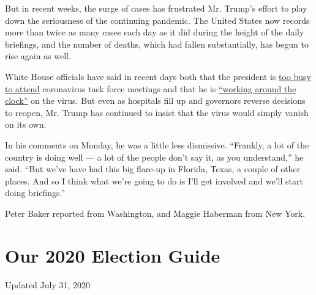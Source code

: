 But in recent weeks, the surge of cases has frustrated Mr. Trump's
effort to play down the seriousness of the continuing pandemic. The
United States now records more than twice as many cases each day as it
did during the height of the daily briefings, and the number of deaths,
which had fallen substantially, has begun to rise again as well.

White House officials have said in recent days both that the president
is
\href{https://www.washingtonpost.com/politics/trump-defends-bungled-handling-of-coronavirus-with-falsehoods-and-dubious-claims/2020/07/19/1b57cb3e-c9e6-11ea-91f1-28aca4d833a0_story.html}{too
busy to attend} coronavirus task force meetings and that he is
\href{https://www.nytimes.com/2020/07/19/us/politics/republicans-contradict-trump-coronavirus.html}{``working
around the clock''} on the virus. But even as hospitals fill up and
governors reverse decisions to reopen, Mr. Trump has continued to insist
that the virus would simply vanish on its own.

In his comments on Monday, he was a little less dismissive. ``Frankly, a
lot of the country is doing well --- a lot of the people don't say it,
as you understand,'' he said. ``But we've have had this big flare-up in
Florida, Texas, a couple of other places. And so I think what we're
going to do is I'll get involved and we'll start doing briefings.''

Peter Baker reported from Washington, and Maggie Haberman from New York.

\hypertarget{our-2020-election-guide}{%
\section{Our 2020 Election Guide}\label{our-2020-election-guide}}

Updated July 31, 2020

